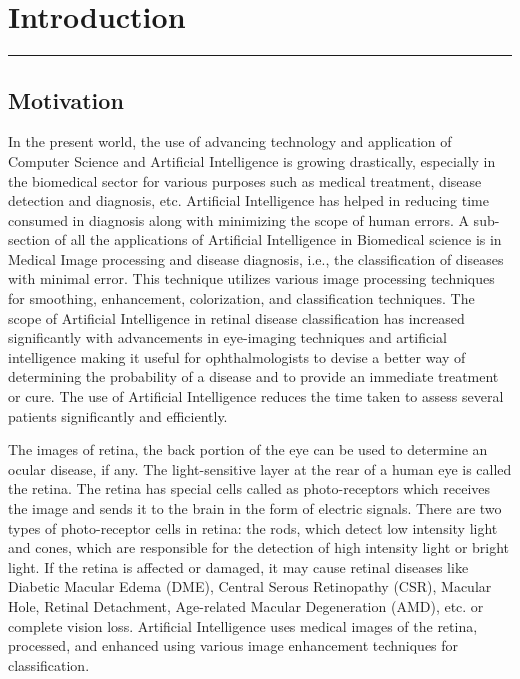 \chapter{Introduction}
\label{chapter:introduction} 
\noindent\rule{\linewidth}{2pt}

\section{Motivation}
In the present world, the use of advancing technology and application of Computer Science and Artificial Intelligence is growing drastically, especially in the biomedical sector for various purposes such as medical treatment, disease detection and diagnosis, etc. Artificial Intelligence has helped in reducing time consumed in diagnosis along with minimizing the scope of human errors. A sub-section of all the applications of Artificial Intelligence in Biomedical science is in Medical Image processing and disease diagnosis, i.e., the classification of diseases with minimal error. This technique utilizes various image processing techniques for smoothing, enhancement, colorization, and classification techniques. The scope of Artificial Intelligence in retinal disease classification has increased significantly with advancements in eye-imaging techniques and artificial intelligence making it useful for ophthalmologists to devise a better way of determining the probability of a disease and to provide an immediate treatment or cure. The use of Artificial Intelligence reduces the time taken to assess several patients significantly and efficiently.

\par
The images of retina, the back portion of the eye can be used to determine an ocular disease, if any. The light-sensitive layer at the rear of a human eye is called the retina. The retina has special cells called as photo-receptors which receives the image and sends it to the brain in the form of electric signals. There are two types of photo-receptor cells in retina: the rods, which detect low intensity light and cones, which are responsible for the detection of high intensity light or bright light. If the retina is affected or damaged, it may cause retinal diseases like Diabetic Macular Edema (DME), Central Serous Retinopathy (CSR), Macular Hole, Retinal Detachment, Age-related Macular Degeneration (AMD), etc. or complete vision loss. Artificial Intelligence uses medical images of the retina, processed, and enhanced using various image enhancement techniques for classification. 

